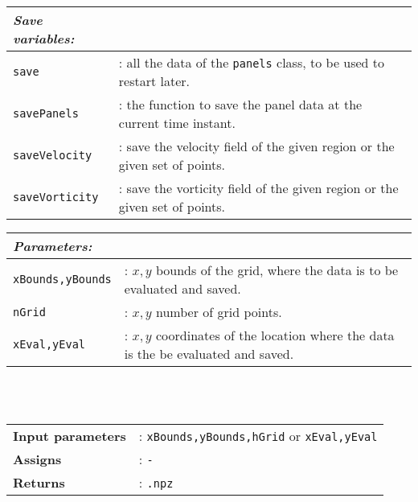 		\begin{tabular}{lp{10cm}}
			\textit{Save variables:} & \\ \hline
			\texttt{save} &: all the data of the \texttt{panels} class, to be used to restart later.\\ 			
			\texttt{savePanels} &: the function to save the panel data at the current time instant.\\ 			
			\texttt{saveVelocity} &: save the velocity field of the given region or the given set of points.\\ 
			\texttt{saveVorticity} &: save the vorticity field of the given region or the given set of points.\\ 
		\end{tabular} \vspace{5 mm}
	
		\begin{tabular}{lp{10cm}}
			\textit{Parameters:} & \\ \hline
			\texttt{xBounds,yBounds} &: $x,y$ bounds of the grid, where the data is to be evaluated and saved.\\ 
			\texttt{nGrid} &: $x,y$ number of grid points.\\ 
			\texttt{xEval,yEval} &: $x,y$ coordinates of the location where the data is the be evaluated and saved.\\ 
		\end{tabular} \vspace{5 mm}\\
	\\
	\begin{tabular}{lp{10cm}}
		\textbf{Input parameters} &: \texttt{xBounds,yBounds,hGrid} or \texttt{xEval,yEval}\\ 
		\textbf{Assigns} &: \texttt{-}\\ 			
		\textbf{Returns} &: \texttt{.npz}\\ 					
	\end{tabular}

